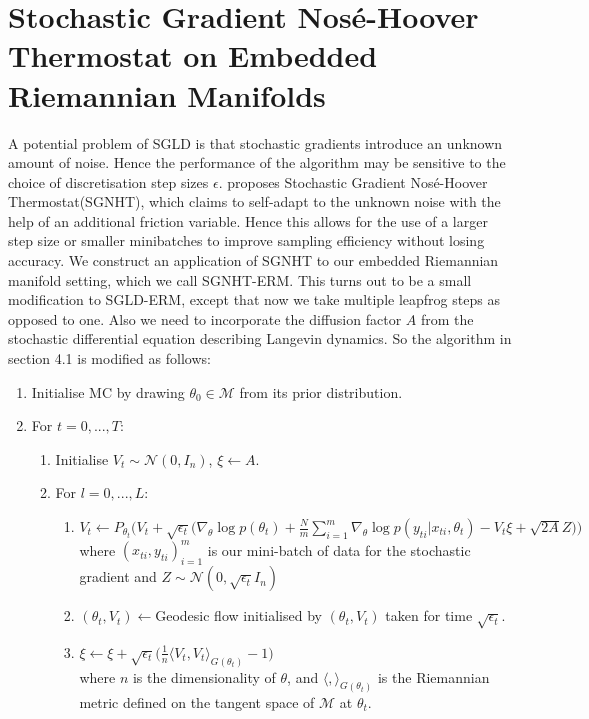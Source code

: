 \documentclass[a4paper,10pt]{article}
\begin{document}
\section{Stochastic Gradient Nos\'{e}-Hoover Thermostat on Embedded Riemannian Manifolds}
A potential problem of SGLD is that stochastic gradients introduce an unknown amount of noise. Hence the performance of the algorithm may be sensitive to the choice of discretisation step sizes $\epsilon$. \cite{ding2014bayesian} proposes Stochastic Gradient Nos\'{e}-Hoover Thermostat(SGNHT), which claims to self-adapt to the unknown noise with the help of an additional friction variable. Hence this allows for the use of a larger step size or smaller minibatches to improve sampling efficiency without losing accuracy. We construct an application of SGNHT to our embedded Riemannian manifold setting, which we call SGNHT-ERM. This turns out to be a small modification to SGLD-ERM, except that now we take multiple leapfrog steps as opposed to one. Also we need to incorporate the diffusion factor $A$ from the stochastic differential equation describing Langevin dynamics. So the algorithm in section 4.1 is modified as follows:
\begin{enumerate}
\item Initialise MC by drawing $\theta_0 \in \mathcal{M}$ from its prior distribution. 
\item For $t=0,...,T$:
\begin{enumerate}
\item Initialise $V_t\sim \mathcal{N}(0,I_n)$, $\xi \leftarrow A$.
\item For $l=0,...,L$:
\begin{enumerate}
\item \mbox{$V_t \leftarrow P_{\theta_t}\bigg(V_t+\sqrt{\epsilon_t}\Big(\nabla_{\theta}\log p(\theta_t)+\frac{N}{m}\sum_{i=1}^m \nabla_{\theta}\log p(y_{ti}|x_{ti},\theta_t)-V_t \xi +\sqrt{2A}Z \Big)\bigg)$} 
\\ where $(x_{ti},y_{ti})_{i=1}^m$ is our mini-batch of data for the stochastic gradient and $Z \sim \mathcal{N}(0,\sqrt{\epsilon_t}I_n)$
\item $(\theta_t,V_t) \leftarrow $Geodesic flow initialised by $(\theta_t,V_t)$ taken for time $\sqrt{\epsilon_t}$.
\item $\xi \leftarrow \xi + \sqrt{\epsilon_t}\Big(\frac{1}{n}\langle V_t,V_t \rangle_{G(\theta_t)} -1\Big)$ \\ where $n$ is the dimensionality of $\theta$, and $\langle , \rangle_{G(\theta_t)}$ is the Riemannian metric defined on the tangent space of $\mathcal{M}$ at $\theta_t$.
\end{enumerate}
\end{enumerate}

\end{enumerate}
\end{document}
